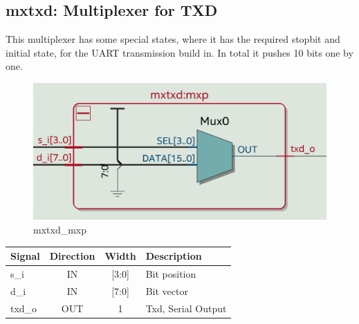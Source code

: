 \documentclass[12pt,a4 paper] {report}
\begin{document}
\newpage

\subsection{mxtxd: Multiplexer for TXD}
This multiplexer has some special states, where it has the required stopbit and initial state, for the UART transmission 
build in. In total it pushes 10 bits one by one.
\begin{figure}[h]
	\centering	
	\includegraphics[scale=0.15]{../png/mxtxd_mxp.png}
	\caption{mxtxd\_mxp}
\end{figure}
\begin{center}
	\begin{tabular}{ | p{2cm} | c | c | p{5cm} |}
		\hline
		\textbf{Signal} & \textbf{Direction} & \textbf{Width} & \textbf{Description} \\
		\hline
		s\_i & IN & [3:0] & Bit position \\
		\hline
		d\_i & IN & [7:0] & Bit vector \\
		\hline
		txd\_o & OUT & 1 & Txd, Serial Output \\
		\hline
	\end{tabular}
\end{center} 

\newpage
\end{document}
